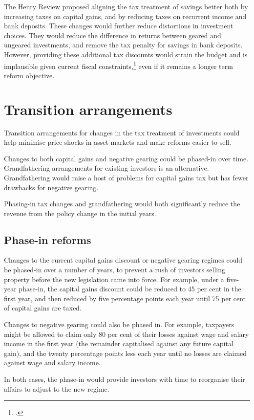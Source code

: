 The Henry Review proposed aligning the tax treatment of savings better both by increasing taxes on capital gains, and by reducing taxes on recurrent income and bank deposits. These changes would further reduce distortions in investment choices. They would reduce the difference in returns between geared and ungeared investments, and remove the tax penalty for savings in bank deposits. However, providing these additional tax discounts would strain the budget and is implausible given current fiscal constraints,\footcites{Daley2015} even if it remains a longer term reform objective.

\chapter{Transition arrangements}
Transition arrangements for changes in the tax treatment of investments could help minimise price shocks in asset markets and make reforms easier to sell. 

Changes to both capital gains and negative gearing could be phased-in over time. Grandfathering arrangements for existing investors is an alternative. Grandfathering would raise a host of problems for capital gains tax but has fewer drawbacks for negative gearing. 

Phasing-in tax changes and grandfathering would both significantly reduce the revenue from the policy change in the initial years. 

\section{Phase-in reforms}
Changes to the current capital gains discount or negative gearing regimes could be phased-in over a number of years, to prevent a rush of investors selling property before the new legislation came into force. For example, under a five-year phase-in, the capital gains discount could be reduced to 45 per cent in the first year, and then reduced by five percentage points each year until 75 per cent of capital gains are taxed. 

Changes to negative gearing could also be phased in. For example, taxpayers might be allowed to claim only 80 per cent of their losses against wage and salary income in the first year (the remainder capitalised against any future capital gain), and the twenty percentage points less each year until no losses are claimed against wage and salary income.

In both cases, the phase-in would provide investors with time to reorganise their affairs to adjust to the new regime.

